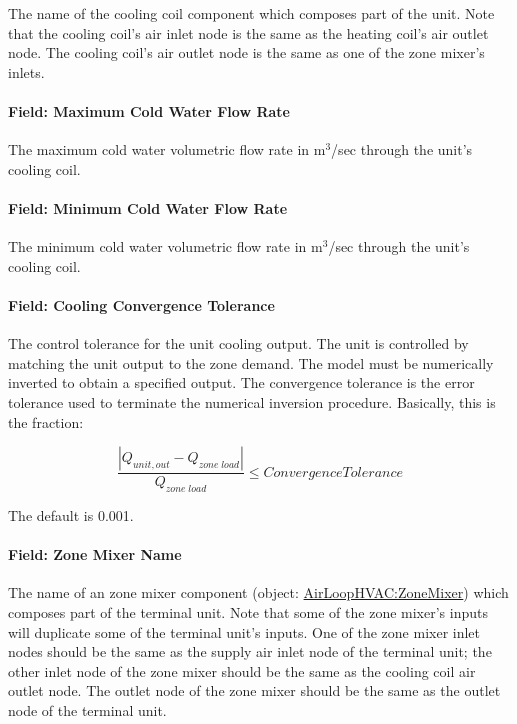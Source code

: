 The name of the cooling coil component which composes part of the unit. Note that the cooling coil's air inlet node is the same as the heating coil's air outlet node. The cooling coil's air outlet node is the same as one of the zone mixer's inlets.

\paragraph{Field: Maximum Cold Water Flow Rate}\label{field-maximum-cold-water-flow-rate}

The maximum cold water volumetric flow rate in m\(^{3}\)/sec through the unit's cooling coil.

\paragraph{Field: Minimum Cold Water Flow Rate}\label{field-minimum-cold-water-flow-rate}

The minimum cold water volumetric flow rate in m\(^{3}\)/sec through the unit's cooling coil.

\paragraph{Field: Cooling Convergence Tolerance}\label{field-cooling-convergence-tolerance}

The control tolerance for the unit cooling output. The unit is controlled by matching the unit output to the zone demand. The model must be numerically inverted to obtain a specified output. The convergence tolerance is the error tolerance used to terminate the numerical inversion procedure. Basically, this is the fraction:

\begin{equation}
\frac{{\left| {{Q_{unit,out}} - {Q_{zone\;load}}} \right|}}{{{Q_{zone\;load}}}} \le ConvergenceTolerance
\end{equation}

The default is 0.001.

\paragraph{Field: Zone Mixer Name}\label{field-zone-mixer-name-2}

The name of an zone mixer component (object: \hyperref[airloophvaczonemixer]{AirLoopHVAC:ZoneMixer}) which composes part of the terminal unit. Note that some of the zone mixer's inputs will duplicate some of the terminal unit's inputs. One of the zone mixer inlet nodes should be the same as the supply air inlet node of the terminal unit; the other inlet node of the zone mixer should be the same as the cooling coil air outlet node. The outlet node of the zone mixer should be the same as the outlet node of the terminal unit.

